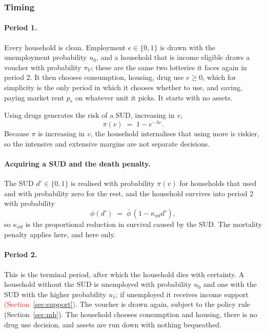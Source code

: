\documentclass[10pt]{article}
\begin{document}
\subsubsection{Timing}


\paragraph{Period 1.} Every household is clean. Employment $e\in\{0,1\}$ is
drawn with the unemployment probability $u_0$, and a household that is income
eligible draws a voucher with probability $\pi_V$; these are the same two
lotteries it faces again in period 2. It then chooses consumption, housing, drug
use $v\ge0$, which for simplicity is the only period in which it chooses whether
to use, and saving, paying market rent $p_r$ on
whatever unit it picks. It starts with no assets.

Using drugs generates the risk
of a SUD, increasing in $v$,
\begin{equation}\label{eq:hazard}
\pi(v) \;=\; 1 - e^{-\lambda v} .
\end{equation}
Because $\pi$ is increasing in $v$, the household internalises that using more
is riskier, so the intensive and extensive margins are not separate decisions.

\paragraph{Acquiring a SUD and the death penalty.} The SUD $d'\in\{0,1\}$ is realised with
probability $\pi(v)$ for households that used and with probability zero for the
rest, and the household survives into period 2 with probability
\begin{equation}\label{eq:surv}
\phi(d') \;=\; \bar\phi\,(1-\kappa_{\phi d} d'),
\end{equation}
so $\kappa_{\phi d}$ is the proportional reduction in survival caused by the SUD.
The mortality penalty applies here, and here only.

\paragraph{Period 2.} This is the terminal period, after which the household dies with certainty. A
household without the SUD is unemployed with probability $u_0$ and one with
the SUD with the higher probability $u_1$; if unemployed it receives income
support \textcolor{red}{(Section~\ref{sec:support})}. The voucher is drawn again, subject to the policy rule (Section~\ref{sec:mh}). The household
chooses consumption and housing, there is no drug use decision, and assets are
run down with nothing bequeathed.
\end{document}
